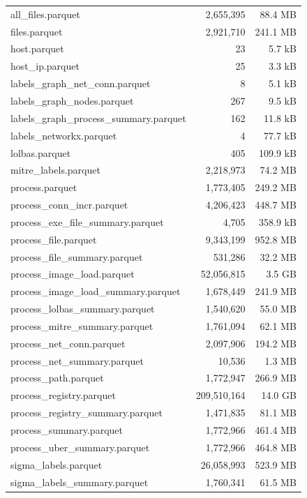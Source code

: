 \documentclass[conference,compsoc]{IEEEtran}
\begin{document}
\begin{longtable}{|l|r|r|}
all\_files.parquet                     & 2{,}655{,}395   & 88.4 MB   \\
files.parquet                          & 2{,}921{,}710   & 241.1 MB  \\
host.parquet                           & 23              & 5.7 kB    \\
host\_ip.parquet                       & 25              & 3.3 kB    \\
labels\_graph\_net\_conn.parquet       & 8               & 5.1 kB    \\
labels\_graph\_nodes.parquet           & 267             & 9.5 kB    \\
labels\_graph\_process\_summary.parquet & 162            & 11.8 kB   \\
labels\_networkx.parquet               & 4               & 77.7 kB   \\
lolbas.parquet                         & 405             & 109.9 kB  \\
mitre\_labels.parquet                  & 2{,}218{,}973   & 74.2 MB   \\
process.parquet                        & 1{,}773{,}405   & 249.2 MB  \\
process\_conn\_incr.parquet            & 4{,}206{,}423   & 448.7 MB  \\
process\_exe\_file\_summary.parquet    & 4{,}705         & 358.9 kB  \\
process\_file.parquet                  & 9{,}343{,}199   & 952.8 MB  \\
process\_file\_summary.parquet         & 531{,}286       & 32.2 MB   \\
process\_image\_load.parquet           & 52{,}056{,}815  & 3.5 GB    \\
process\_image\_load\_summary.parquet  & 1{,}678{,}449   & 241.9 MB  \\
process\_lolbas\_summary.parquet       & 1{,}540{,}620   & 55.0 MB   \\
process\_mitre\_summary.parquet        & 1{,}761{,}094   & 62.1 MB   \\
process\_net\_conn.parquet             & 2{,}097{,}906   & 194.2 MB  \\
process\_net\_summary.parquet          & 10{,}536        & 1.3 MB    \\
process\_path.parquet                  & 1{,}772{,}947   & 266.9 MB  \\
process\_registry.parquet              & 209{,}510{,}164 & 14.0 GB   \\
process\_registry\_summary.parquet     & 1{,}471{,}835   & 81.1 MB   \\
process\_summary.parquet               & 1{,}772{,}966   & 461.4 MB  \\
process\_uber\_summary.parquet         & 1{,}772{,}966   & 464.8 MB  \\
sigma\_labels.parquet                  & 26{,}058{,}993  & 523.9 MB  \\
sigma\_labels\_summary.parquet         & 1{,}760{,}341   & 61.5 MB   \\

\end{longtable}
\end{document}
